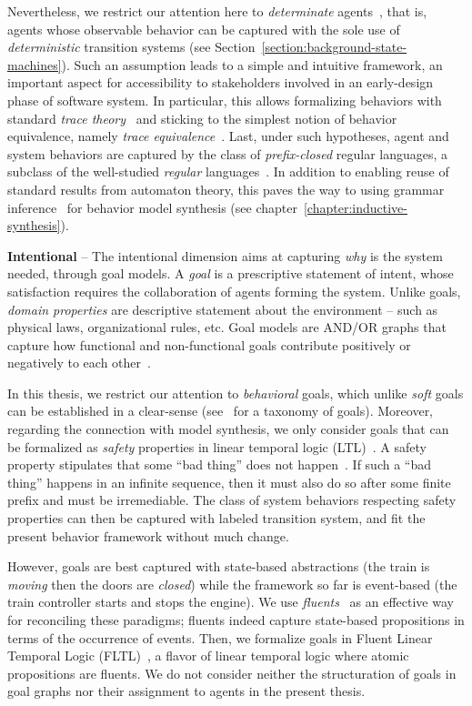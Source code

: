 Nevertheless, we restrict our attention here to \emph{determinate} agents~\cite{Engelfriet:1985}, that is, agents whose observable behavior can be captured with the sole use of \emph{deterministic} transition systems (see Section~\ref{section:background-state-machines}). Such an assumption leads to a simple and intuitive framework, an important aspect for accessibility to stakeholders involved in an early-design phase of software system. In particular, this allows formalizing behaviors with standard \emph{trace theory}~\cite{Hoare:1985} and sticking to the simplest notion of behavior equivalence, namely \emph{trace equivalence}~\cite{Engelfriet:1985}. Last, under such hypotheses, agent and system behaviors are captured by the class of \emph{prefix-closed} regular languages, a subclass of the well-studied \emph{regular} languages~\cite{Hopcroft:1979, Aho:1986}. In addition to enabling reuse of standard results from automaton theory, this paves the way to using grammar inference~\cite{Gold:1978} for behavior model synthesis (see chapter~\ref{chapter:inductive-synthesis}). 

\noindent \textbf{Intentional} -- The intentional dimension aims at capturing \emph{why} is the system needed, through goal models. A \emph{goal} is a prescriptive statement of intent, whose satisfaction requires the collaboration of agents forming the system. Unlike goals, \emph{domain properties} are descriptive statement about the environment -- such as physical laws, organizational rules, etc. Goal models are AND/OR graphs that capture how functional and non-functional goals contribute positively or negatively to each other~\cite{VanLamsweerde:2000, VanLamsweerde:2004}.

In this thesis, we restrict our attention to \emph{behavioral} goals, which unlike \emph{soft} goals can be established in a clear-sense (see~\cite{VanLamsweerde:2009} for a taxonomy of goals). Moreover, regarding the connection with model synthesis, we only consider goals that can be formalized as \emph{safety} properties in linear temporal logic (LTL)~\cite{Manna:1992}. A safety property stipulates that some ``bad thing'' does not happen~\cite{Alpern:1986}. If such a ``bad thing'' happens in an infinite sequence, then it must also do so after some finite prefix and must be irremediable. The class of system behaviors respecting safety properties can then be captured with labeled transition system, and fit the present behavior framework without much change.

However, goals are best captured with state-based abstractions (the train is \emph{moving} then the doors are \emph{closed}) while the framework so far is event-based (the train controller starts and stops the engine). We use \emph{fluents}~\cite{Miller:2002} as an effective way for reconciling these paradigms; fluents indeed capture state-based propositions in terms of the occurrence of events. Then, we formalize goals in Fluent Linear Temporal Logic (FLTL)~\cite{Giannakopoulou:2003}, a flavor of linear temporal logic where atomic propositions are fluents. We do not consider neither the structuration of goals in goal graphs nor their assignment to agents in the present thesis.

